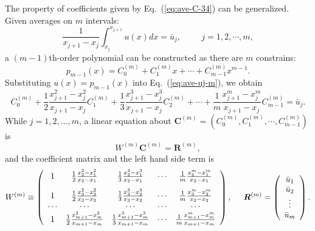 \documentclass[]{article}
\def\Matrix#1{\left(#1\right)}
\def\Matrix#1{\left(#1\right)}
\begin{document}
The property of coefficients given by Eq.~(\ref{eq:ave-C-34}) can be
generalized.
Given averages on $m$ intervals:
\begin{equation}
\frac{1}{x_{j+1}-x_j}\int_{x_j}^{x_{j+1}}u(x)dx=\bar
u_j,\hspace{1cm}j=1,2,\cdots,m,
\label{eq:ave-uj-m}
\end{equation}
a $(m-1)$th-order polynomial can be constructed as there are $m$ constrains:
\begin{equation}
p_{m-1}(x) = C_0^{(m)}+C_1^{(m)}x + \cdots +C_{m-1}^{(m)}x^{m-1}.
\label{eq:p-m1-x}
\end{equation}
Substituting $u(x) = p_{m-1}(x)$ into Eq.~(\ref{eq:ave-uj-m}), we obtain
\begin{equation}
C_0^{(m)}+\frac{1}{2}\frac{x_{j+1}^2-x_j^2}{x_{j+1}-x_j}C_1^{(m)}+\frac{1}{3}\frac{x_{j+1}^3-x_j^3}{x_{j+1}-x_j}C_2^{(m)}+\cdots+\frac{1}{m}\frac{x_{j+1}^m-x_j^m}{x_{j+1}-x_j}C_{m-1}^{(m)} =\bar u_j.
\label{eq:ave-uj-C}
\end{equation}
While $j=1,2,\ldots,m$, a linear equation about 
$ \bm C^{(m)}=(C_0^{(m)},C_1^{(m)},\cdots,C_{m-1}^{(m)})$ is 
\begin{equation}
W^{(m)}\bm C^{(m)}=\bm R^{(m)},
\label{eq:WC=R}
\end{equation}
and the coefficient matrix and the left hand side term is
\begin{equation*}
W^{(m)}\equiv\Matrix{\begin{array}{ccccc}
1& \frac{1}{2}\frac{x_{2}^2-x_1^2}{x_{2}-x_1} &\frac{1}{3}\frac{x_{2}^3-x_1^3}{x_{2}-x_1} & \cdots & \frac{1}{m}\frac{x_{2}^m-x_1^m}{x_{2}-x_1} \\[3mm]
1& \frac{1}{2}\frac{x_{3}^2-x_2^2}{x_{3}-x_2} &\frac{1}{3}\frac{x_{3}^3-x_2^3}{x_{3}-x_2} & \cdots & \frac{1}{m}\frac{x_{3}^m-x_2^m}{x_{3}-x_2} \\
\cdots &\cdots &\cdots &\cdots &\cdots \\
1& \frac{1}{2}\frac{x_{m+1}^2-x_m^2}{x_{m+1}-x_m} &\frac{1}{3}\frac{x_{m+1}^3-x_m^3}{x_{m+1}-x_m} & \cdots & \frac{1}{m}\frac{x_{m+1}^m-x_m^m}{x_{m+1}-x_m} \\
\end{array}},\hspace{5mm}
\bm R^{(m)}=\Matrix{\begin{array}{c}\bar u_1\\ \bar u_2\\ \vdots\\ \bar u_m\\ \end{array}}.
\end{equation*}
\end{document}
